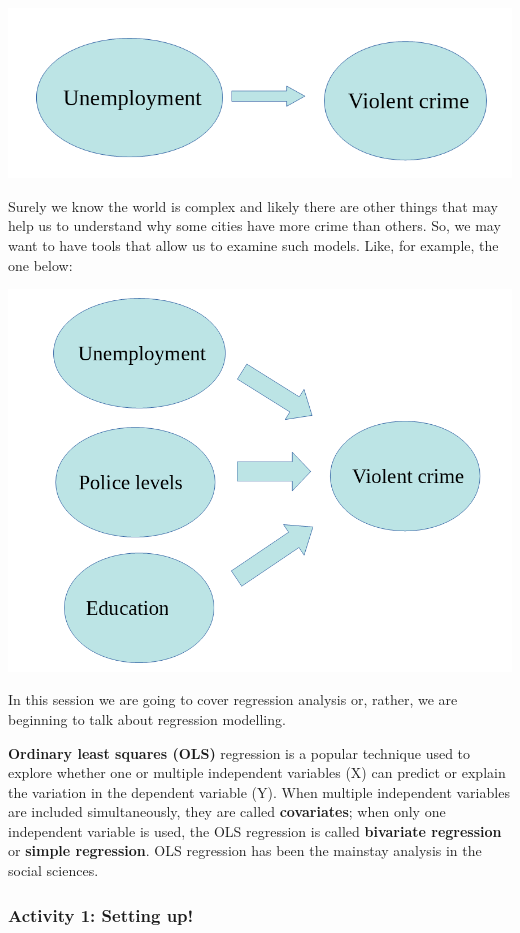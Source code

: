 \documentclass[
]{book}
\begin{document}
\includegraphics{Images/model1.png}

Surely we know the world is complex and likely there are other things that may help us to understand why some cities have more crime than others. So, we may want to have tools that allow us to examine such models. Like, for example, the one below:

\includegraphics{Images/model2.png}

In this session we are going to cover regression analysis or, rather, we are beginning to talk about regression modelling.

\textbf{Ordinary least squares (OLS)} regression is a popular technique used to explore whether one or multiple independent variables (X) can predict or explain the variation in the dependent variable (Y). When multiple independent variables are included simultaneously, they are called \textbf{covariates}; when only one independent variable is used, the OLS regression is called \textbf{bivariate regression} or \textbf{simple regression}. OLS regression has been the mainstay analysis in the social sciences.

\hypertarget{activity-1-setting-up}{%
\subsubsection{Activity 1: Setting up!}\label{activity-1-setting-up}}
\end{document}
